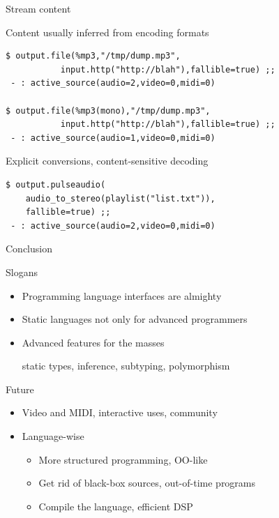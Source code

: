 \documentclass{beamer}
\renewcommand{\emph}[1]{\alert{#1}}
\begin{document}
\begin{frame}[fragile]{Stream content}

\vfill

Content usually inferred from encoding formats
\begin{lstlisting}
$ output.file(%mp3,"/tmp/dump.mp3",
           input.http("http://blah"),fallible=true) ;;
 - : active_source(audio=2,video=0,midi=0)

$ output.file(%mp3(mono),"/tmp/dump.mp3",
           input.http("http://blah"),fallible=true) ;;
 - : active_source(audio=1,video=0,midi=0)
\end{lstlisting}

\vfill

Explicit conversions, content-sensitive decoding
\begin{lstlisting}
$ output.pulseaudio(
    audio_to_stereo(playlist("list.txt")),
    fallible=true) ;;
 - : active_source(audio=2,video=0,midi=0)
\end{lstlisting}

\end{frame}



\begin{frame}{Conclusion}

\begin{block}{Slogans}
\begin{itemize}
\item Programming language interfaces are almighty
\item Static languages not only for advanced programmers
\item Advanced features for the masses \\
\begin{flushright}
  {\small static types, inference, subtyping, polymorphism}
\end{flushright}
\end{itemize}
\end{block}

\vfill

\begin{block}{Future}
\begin{itemize}
\item Video and MIDI, interactive uses, community
\item Language-wise
\begin{itemize}
  \item More structured programming, OO-like
  \item Get rid of \emph{black-box sources}, out-of-time programs
  \item \emph{Compile} the language, efficient DSP
\end{itemize}
\end{itemize}
\end{block}

\end{frame}
\end{document}
